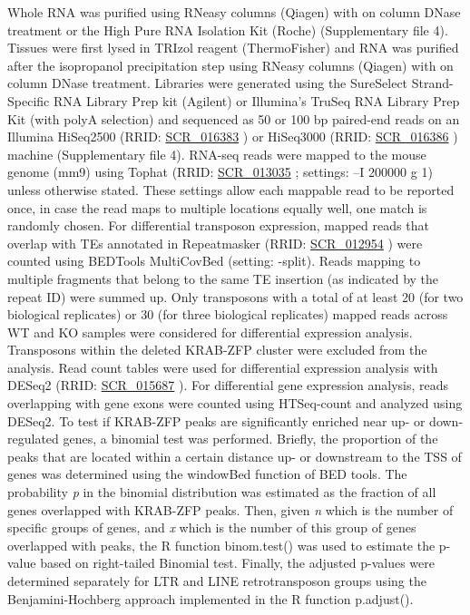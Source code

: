 \documentclass[11pt,a4paper]{article}
\begin{document}
Whole RNA was purified using RNeasy columns (Qiagen) with on column DNase treatment or the High Pure RNA Isolation Kit (Roche) (Supplementary file 4). Tissues were first lysed in TRIzol reagent (ThermoFisher) and RNA was purified after the isopropanol precipitation step using RNeasy columns (Qiagen) with on column DNase treatment. Libraries were generated using the SureSelect Strand-Specific RNA Library Prep kit (Agilent) or Illumina’s TruSeq RNA Library Prep Kit (with polyA selection) and sequenced as 50 or 100 bp paired-end reads on an Illumina HiSeq2500 (RRID: \href{https://scicrunch.org/resolver/SCR\_016383}{SCR\_016383} ) or HiSeq3000 (RRID: \href{https://scicrunch.org/resolver/SCR\_016386}{SCR\_016386} ) machine (Supplementary file 4). RNA-seq reads were mapped to the mouse genome (mm9) using Tophat (RRID: \href{https://scicrunch.org/resolver/SCR\_013035}{SCR\_013035} ; settings: --I 200000 g 1) unless otherwise stated. These settings allow each mappable read to be reported once, in case the read maps to multiple locations equally well, one match is randomly chosen. For differential transposon expression, mapped reads that overlap with TEs annotated in Repeatmasker (RRID: \href{https://scicrunch.org/resolver/SCR\_012954}{SCR\_012954} ) were counted using BEDTools MultiCovBed (setting: -split). Reads mapping to multiple fragments that belong to the same TE insertion (as indicated by the repeat ID) were summed up. Only transposons with a total of at least 20 (for two biological replicates) or 30 (for three biological replicates) mapped reads across WT and KO samples were considered for differential expression analysis. Transposons within the deleted KRAB-ZFP cluster were excluded from the analysis. Read count tables were used for differential expression analysis with DESeq2 (RRID: \href{https://scicrunch.org/resolver/SCR\_015687}{SCR\_015687} ). For differential gene expression analysis, reads overlapping with gene exons were counted using HTSeq-count and analyzed using DESeq2. To test if KRAB-ZFP peaks are significantly enriched near up- or down-regulated genes, a binomial test was performed. Briefly, the proportion of the peaks that are located within a certain distance up- or downstream to the TSS of genes was determined using the windowBed function of BED tools. The probability \textit{p} in the binomial distribution was estimated as the fraction of all genes overlapped with KRAB-ZFP peaks. Then, given \textit{n} which is the number of specific groups of genes, and \textit{x} which is the number of this group of genes overlapped with peaks, the R function binom.test() was used to estimate the p-value based on right-tailed Binomial test. Finally, the adjusted p-values were determined separately for LTR and LINE retrotransposon groups using the Benjamini-Hochberg approach implemented in the R function p.adjust().
\end{document}
